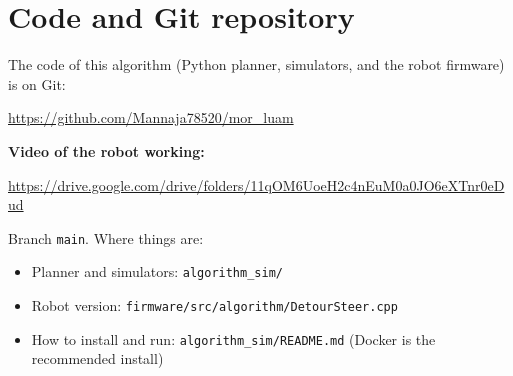 \documentclass[11pt,a4paper]{article}
\begin{document}
\clearpage
\section*{Code and Git repository}
The code of this algorithm (Python planner, simulators, and the robot firmware) is on Git:

\begin{center}
\large\url{https://github.com/Mannaja78520/mor_luam}
\end{center}

\noindent\textbf{Video of the robot working:}
\begin{center}
\url{https://drive.google.com/drive/folders/11qOM6UoeH2c4nEuM0a0JO6eXTnr0eDud}
\end{center}
\par\medskip

\noindent Branch \texttt{main}. Where things are:
\begin{itemize}
\item Planner and simulators: \texttt{algorithm\_sim/}
\item Robot version: \texttt{firmware/src/algorithm/DetourSteer.cpp}
\item How to install and run: \texttt{algorithm\_sim/README.md} (Docker is the recommended install)
\end{itemize}
\end{document}
